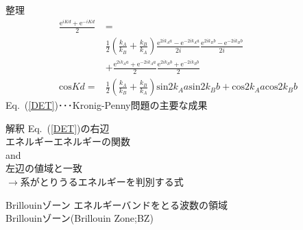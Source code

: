 \documentclass[unicode, 12pt, aspectratio=169]{beamer}
\newcommand{\eref}[1]{Eq.~(\ref{#1})}
\begin{document}
\begin{frame}
  \begin{block}{整理}
    \begin{align}
    \frac{\mathrm{e}^{iKd}+\mathrm{e}^{-iKd}}{2}&=\nonumber\\
    &\frac{1}{2}\left(\frac{k_A}{k_B}+\frac{k_B}{k_A}\right)\frac{\mathrm{e}^{2ik_Aa}-\mathrm{e}^{-2ik_Aa}}{2i}\frac{\mathrm{e}^{2ik_Bb}-\mathrm{e}^{-2ik_Bb}}{2i}\nonumber\\
    &+\frac{\mathrm{e}^{2ik_Aa}+\mathrm{e}^{-2ik_Aa}}{2}\frac{\mathrm{e}^{2ik_Bb}+\mathrm{e}^{-2ik_Bb}}{2}\nonumber\\
    \mathrm{cos} Kd=&\frac{1}{2}\left(\frac{k_A}{k_B}+\frac{k_B}{k_A}\right)\mathrm{sin} 2k_Aa\mathrm{sin} 2k_Bb+\mathrm{cos} 2k_Aa\mathrm{cos} 2k_Bb\label{DET} 
    \end{align}
    \eref{DET}･･･Kronig-Penny問題の主要な成果
    \end{block}
\end{frame}

\begin{frame}
  \begin{block}{解釈}
    \eref{DET}の右辺\\
    エネルギーエネルギーの関数\\
    \alert{and}\\
    左辺の値域と一致\\
    $\rightarrow$系がとりうるエネルギーを判別する式
  \end{block}
  \begin{block}{Brillouinゾーン}
   エネルギーバンドをとる波数の領域\\
   Brillouinゾーン(Brillouin Zone;BZ)
  \end{block}
\end{frame}
\end{document}
